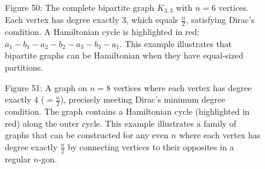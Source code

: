 \documentclass{article}
\theoremstyle{definition}
\begin{document}
\begin{figure}[h!]
\begin{center}
\end{center}

\begin{center}
\small Figure 50: The complete bipartite graph $K_{3,3}$ with $n = 6$ vertices. Each vertex has degree exactly 3, which equals $\frac{n}{2}$, satisfying Dirac's condition. A Hamiltonian cycle is highlighted in red: $a_1 - b_1 - a_2 - b_2 - a_3 - b_3 - a_1$. This example illustrates that bipartite graphs can be Hamiltonian when they have equal-sized partitions.
\end{center}
\end{figure}

\begin{figure}[h!]
\begin{center}
\end{center}

\begin{center}
\small Figure 51: A graph on $n = 8$ vertices where each vertex has degree exactly 4 ($= \frac{n}{2}$), precisely meeting Dirac's minimum degree condition. The graph contains a Hamiltonian cycle (highlighted in red) along the outer cycle. This example illustrates a family of graphs that can be constructed for any even $n$ where each vertex has degree exactly $\frac{n}{2}$ by connecting vertices to their opposites in a regular $n$-gon.
\end{center}
\end{figure}
\end{document}
